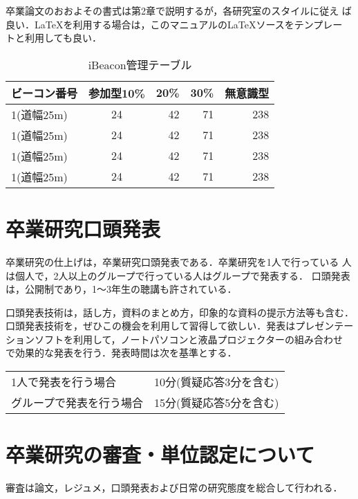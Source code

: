 卒業論文のおおよその書式は第2章で説明するが，各研究室のスタイルに従え
ば良い．\LaTeX を利用する場合は，このマニュアルの\LaTeX ソースをテンプレー
トと利用しても良い．

\begin{table}[htbp]
  \centering
  \vspace{10mm}
  \caption{iBeacon管理テーブル}
  \label{tab:paramM}
  \begin{tabular}{lcrrr} \hline\hline
	ビーコン番号&参加型10\%&20\%&30\%&無意識型\\\hline
	1(道幅25m)&24&42&71&238\\
	1(道幅25m)&24&42&71&238\\
	1(道幅25m)&24&42&71&238\\
	1(道幅25m)&24&42&71&238\\\hline
  \end{tabular}
\end{table}


\section{卒業研究口頭発表}
\label{sec:presentation}

卒業研究の仕上げは，卒業研究口頭発表である．卒業研究を1人で行っている
人は個人で，2人以上のグループで行っている人はグループで発表する．
口頭発表は，公開制であり，1〜3年生の聴講も許されている．

口頭発表技術は，話し方，資料のまとめ方，印象的な資料の提示方法等も含む．
口頭発表技術を，ぜひこの機会を利用して習得して欲しい．発表はプレゼンテー
ションソフトを利用して，ノートパソコンと液晶プロジェクターの組み合わせ
で効果的な発表を行う．発表時間は次を基準とする．\\

\begin{tabular}[h]{ll}
  1人で発表を行う場合 & 10分(質疑応答3分を含む)\\
  グループで発表を行う場合 & 15分(質疑応答5分を含む)\\
\end{tabular}

\section{卒業研究の審査・単位認定について}
\label{sec:referee}
審査は論文，レジュメ，口頭発表および日常の研究態度を総合して行われる．

